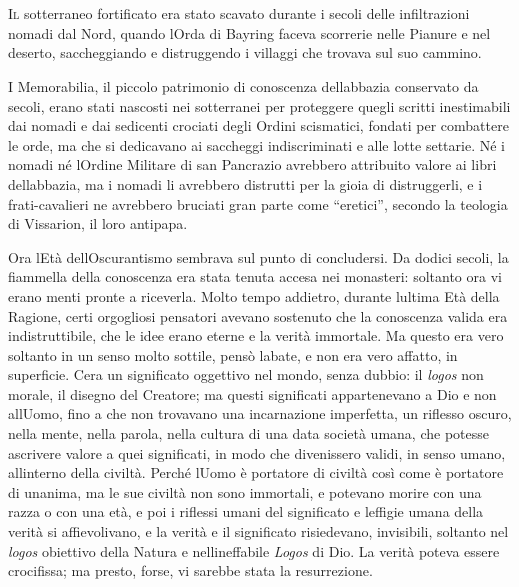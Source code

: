 	\chapter{\phantom{title}}

\lettrine{I}{l} sotterraneo fortificato era stato scavato durante i secoli delle
infiltrazioni nomadi dal Nord, quando l\textquotesingle Orda di Bayring
faceva scorrerie nelle Pianure e nel deserto, saccheggiando e
distruggendo i villaggi che trovava sul suo cammino.

I Memorabilia, il piccolo patrimonio di conoscenza
dell\textquotesingle abbazia conservato da secoli, erano stati nascosti
nei sotterranei per proteggere quegli scritti inestimabili dai nomadi e
dai sedicenti crociati degli Ordini scismatici, fondati per combattere
le orde, ma che si dedicavano ai saccheggi indiscriminati e alle lotte
settarie. Né i nomadi né l\textquotesingle Ordine Militare di san
Pancrazio avrebbero attribuito valore ai libri
dell\textquotesingle abbazia, ma i nomadi li avrebbero distrutti per la
gioia di distruggerli, e i frati-cavalieri ne avrebbero bruciati gran
parte come ``eretici'', secondo la teologia di Vissarion, il loro
antipapa.

Ora l\textquotesingle Età dell\textquotesingle Oscurantismo sembrava sul
punto di concludersi. Da dodici secoli, la fiammella della conoscenza
era stata tenuta accesa nei monasteri: soltanto ora vi erano menti
pronte a riceverla. Molto tempo addietro, durante
l\textquotesingle ultima Età della Ragione, certi orgogliosi pensatori
avevano sostenuto che la conoscenza valida era indistruttibile, che le
idee erano eterne e la verità immortale. Ma questo era vero soltanto in
un senso molto sottile, pensò l\textquotesingle abate, e non era vero
affatto, in superficie. C\textquotesingle era un significato oggettivo
nel mondo, senza dubbio: il \emph{logos} non morale, il disegno del
Creatore; ma questi significati appartenevano a Dio e non
all\textquotesingle Uomo, fino a che non trovavano una incarnazione
imperfetta, un riflesso oscuro, nella mente, nella parola, nella cultura
di una data società umana, che potesse ascrivere valore a quei
significati, in modo che divenissero validi, in senso umano,
all\textquotesingle interno della civiltà. Perché l\textquotesingle Uomo
è portatore di civiltà così come è portatore di
un\textquotesingle anima, ma le sue civiltà non sono immortali, e
potevano morire con una razza o con una età, e poi i riflessi umani del
significato e l\textquotesingle effigie umana della verità si
affievolivano, e la verità e il significato risiedevano, invisibili,
soltanto nel \emph{logos} obiettivo della Natura e
nell\textquotesingle ineffabile \emph{Logos} di Dio. La verità poteva
essere crocifissa; ma presto, forse, vi sarebbe stata la resurrezione.

